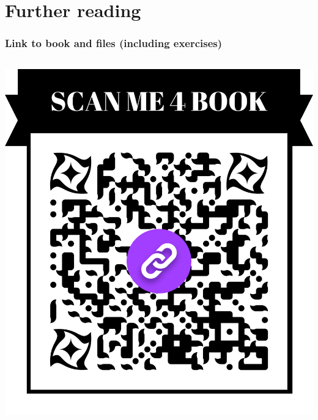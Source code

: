 \documentclass{beamer}
\begin{document}
\section{Further reading}
\begin{frame}
\frametitle{Link to book and files (including exercises)}
\begin{columns}[c] %
\includegraphics[width=\linewidth]{QR_Book}

\end{columns}
\end{frame}
\end{document}
